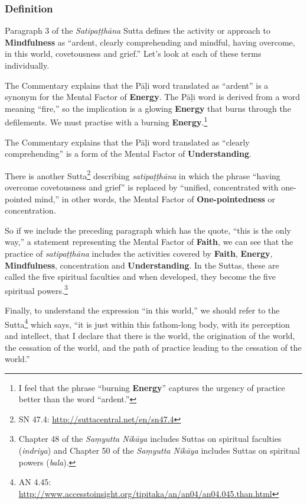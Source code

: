 \subsubsection*{Definition}

Paragraph 3 of the \textit{Satipaṭṭhāna} Sutta defines the activity or approach to \textbf{Mindfulness} as “ardent, clearly comprehending and mindful, having overcome, in this world, covetousness and grief.” Let’s look at each of these terms individually.

The Commentary explains that the Pāḷi word translated as “ardent” is a synonym for the Mental Factor of \textbf{Energy}. The Pāḷi word is derived from a word meaning “fire,” so the implication is a glowing \textbf{Energy} that burns through the defilements. We must practise with a burning \textbf{Energy}.\footnote{I feel that the phrase “burning \textbf{Energy}” captures the urgency of practice better than the word “ardent.”}

The Commentary explains that the Pāḷi word translated as “clearly comprehending” is a form of the Mental Factor of \textbf{Understanding}.

There is another Sutta\footnote{SN 47.4: \url{http://suttacentral.net/en/sn47.4}} describing \textit{satipaṭṭhāna} in which the phrase “having overcome covetousness and grief” is replaced by “unified, concentrated with one-pointed mind,” in other words, the Mental Factor of \textbf{One-pointedness} or concentration.

So if we include the preceding paragraph which has the quote, “this is the only way,” a statement representing the Mental Factor of \textbf{Faith}, we can see that the practice of \textit{satipaṭṭhāna} includes the activities covered by \textbf{Faith}, \textbf{Energy}, \textbf{Mindfulness}, concentration and \textbf{Understanding}. In the Suttas, these are called the five spiritual faculties and when developed, they become the five spiritual powers.\footnote{Chapter 48 of the \textit{Saṃyutta Nikāya} includes Suttas on spiritual faculties (\textit{indriya}) and Chapter 50 of the \textit{Saṃyutta Nikāya} includes Suttas on spiritual powers (\textit{bala}).}

Finally, to understand the expression “in this world,” we should refer to the Sutta\footnote{AN 4.45: \url{http://www.accesstoinsight.org/tipitaka/an/an04/an04.045.than.html}} which says, “it is just within this fathom-long body, with its perception and intellect, that I declare that there is the world, the origination of the world, the cessation of the world, and the path of practice leading to the cessation of the world.”

